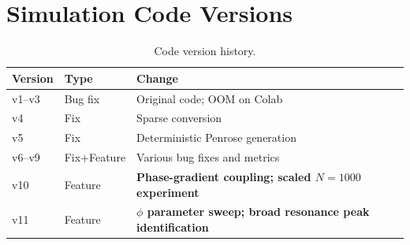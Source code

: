 \documentclass[12pt,a4paper]{article}
\theoremstyle{plain}
\theoremstyle{definition}
\begin{document}
\appendix

\section{Simulation Code Versions}
\label{app:code}

\begin{table}[H]
\centering
\caption{Code version history.}
\label{tab:versions}
\begin{tabular}{llp{8cm}}
\toprule
Version & Type & Change \\
\midrule
v1--v3 & Bug fix & Original code; OOM on Colab \\
v4     & Fix     & Sparse conversion \\
v5     & Fix     & Deterministic Penrose generation \\
v6--v9 & Fix+Feature & Various bug fixes and metrics \\
v10    & Feature & \textbf{Phase-gradient coupling; scaled $N=1000$
                   experiment} \\
v11    & Feature & \textbf{$\phi$ parameter sweep; broad resonance peak
                   identification} \\
\bottomrule
\end{tabular}
\end{table}
\end{document}

